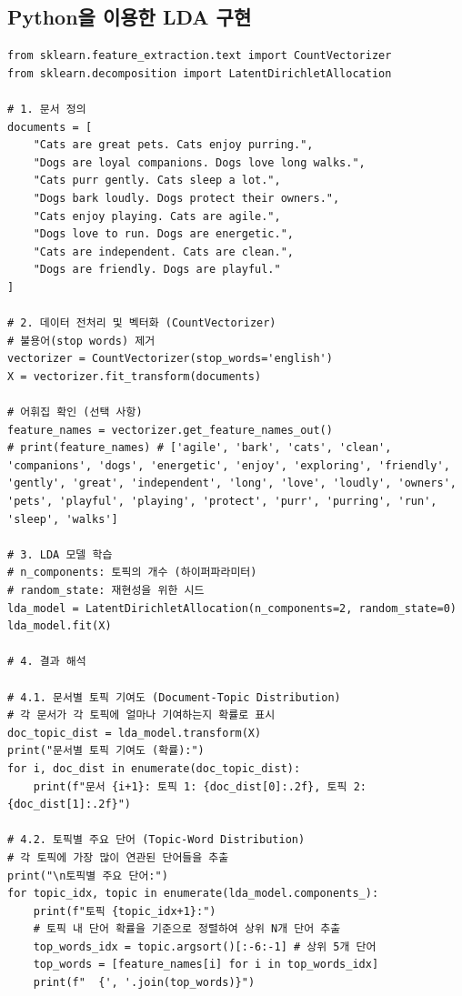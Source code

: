 \documentclass[11pt,a4paper]{article}
\begin{document}
\subsection*{Python을 이용한 LDA 구현}
\begin{lstlisting}[caption={Python을 이용한 LDA 구현 예시}, label={lst:python_lda}]
from sklearn.feature_extraction.text import CountVectorizer
from sklearn.decomposition import LatentDirichletAllocation

# 1. 문서 정의
documents = [
    "Cats are great pets. Cats enjoy purring.",
    "Dogs are loyal companions. Dogs love long walks.",
    "Cats purr gently. Cats sleep a lot.",
    "Dogs bark loudly. Dogs protect their owners.",
    "Cats enjoy playing. Cats are agile.",
    "Dogs love to run. Dogs are energetic.",
    "Cats are independent. Cats are clean.",
    "Dogs are friendly. Dogs are playful."
]

# 2. 데이터 전처리 및 벡터화 (CountVectorizer)
# 불용어(stop words) 제거
vectorizer = CountVectorizer(stop_words='english')
X = vectorizer.fit_transform(documents)

# 어휘집 확인 (선택 사항)
feature_names = vectorizer.get_feature_names_out()
# print(feature_names) # ['agile', 'bark', 'cats', 'clean', 'companions', 'dogs', 'energetic', 'enjoy', 'exploring', 'friendly', 'gently', 'great', 'independent', 'long', 'love', 'loudly', 'owners', 'pets', 'playful', 'playing', 'protect', 'purr', 'purring', 'run', 'sleep', 'walks']

# 3. LDA 모델 학습
# n_components: 토픽의 개수 (하이퍼파라미터)
# random_state: 재현성을 위한 시드
lda_model = LatentDirichletAllocation(n_components=2, random_state=0)
lda_model.fit(X)

# 4. 결과 해석

# 4.1. 문서별 토픽 기여도 (Document-Topic Distribution)
# 각 문서가 각 토픽에 얼마나 기여하는지 확률로 표시
doc_topic_dist = lda_model.transform(X)
print("문서별 토픽 기여도 (확률):")
for i, doc_dist in enumerate(doc_topic_dist):
    print(f"문서 {i+1}: 토픽 1: {doc_dist[0]:.2f}, 토픽 2: {doc_dist[1]:.2f}")

# 4.2. 토픽별 주요 단어 (Topic-Word Distribution)
# 각 토픽에 가장 많이 연관된 단어들을 추출
print("\n토픽별 주요 단어:")
for topic_idx, topic in enumerate(lda_model.components_):
    print(f"토픽 {topic_idx+1}:")
    # 토픽 내 단어 확률을 기준으로 정렬하여 상위 N개 단어 추출
    top_words_idx = topic.argsort()[:-6:-1] # 상위 5개 단어
    top_words = [feature_names[i] for i in top_words_idx]
    print(f"  {', '.join(top_words)}")


\end{lstlisting}
\end{document}
